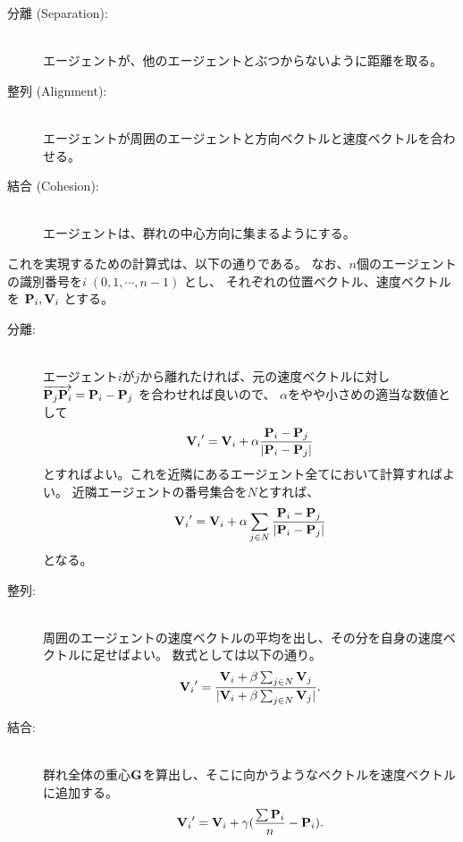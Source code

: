 \begin{description}
\item[分離 (Separation):] ~ \\
	エージェントが、他のエージェントとぶつからないように距離を取る。

\item[整列 (Alignment):] ~ \\
	エージェントが周囲のエージェントと方向ベクトルと速度ベクトルを合わせる。

\item[結合 (Cohesion):] ~ \\
	エージェントは、群れの中心方向に集まるようにする。

\end{description}
これを実現するための計算式は、以下の通りである。
なお、\(n\)個のエージェントの識別番号を\(i \; (0, 1, \cdots, n-1)\) とし、
それぞれの位置ベクトル、速度ベクトルを \(\mathbf{P}_i, \mathbf{V}_i\) とする。

\begin{description}
 \item[分離:] ~ \\
エージェント\(i\)が\(j\)から離れたければ、元の速度ベクトルに対し
\(\overrightarrow{\mathbf{P}_j\mathbf{P}_i} = \mathbf{P}_i - \mathbf{P}_j\) を合わせれば良いので、
\(\alpha\)をやや小さめの適当な数値として
\begin{equation}
	{\mathbf{V}_i}' = \mathbf{V}_i + \alpha \frac{\mathbf{P}_i - \mathbf{P}_j}{|\mathbf{P}_i - \mathbf{P}_j|}
\end{equation}
とすればよい。これを近隣にあるエージェント全てにおいて計算すればよい。
近隣エージェントの番号集合を\(N\)とすれば、
\begin{equation}
	{\mathbf{V}_i}' = \mathbf{V}_i + \alpha \sum_{j \in N}\frac{\mathbf{P}_i - \mathbf{P}_j}{|\mathbf{P}_i - \mathbf{P}_j|}
\end{equation}
となる。

\item[整列:] ~ \\
周囲のエージェントの速度ベクトルの平均を出し、その分を自身の速度ベクトルに足せばよい。
数式としては以下の通り。
\begin{equation}
	{\mathbf{V}_i}' = \frac{\mathbf{V}_i + \beta\sum_{j \in N}\mathbf{V}_j}{|\mathbf{V}_i + \beta\sum_{j \in N}\mathbf{V}_j|} .
\end{equation}

\item[結合:] ~ \\
群れ全体の重心\(\mathbf{G}\)を算出し、そこに向かうようなベクトルを速度ベクトルに追加する。
\begin{equation}
	{\mathbf{V}_i}' = \mathbf{V}_i + \gamma (\frac{\sum\mathbf{P}_i}{n} - \mathbf{P}_i) .
\end{equation}
\end{description}

